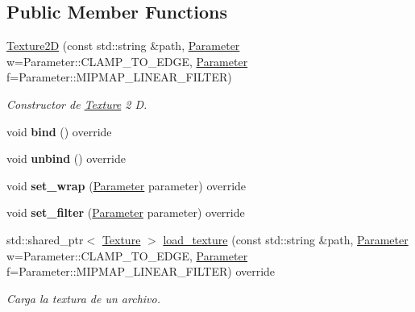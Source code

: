 \subsection*{Public Member Functions}
\begin{DoxyCompactItemize}
\item 
\mbox{\hyperlink{classexample_1_1_texture2_d_ad23ba32ac7e93532c2b794eb71593bfd}{Texture2D}} (const std\+::string \&path, \mbox{\hyperlink{classexample_1_1_texture_a4f7233e69c4a5b913dbe53d729c1765f}{Parameter}} w=Parameter\+::\+C\+L\+A\+M\+P\+\_\+\+T\+O\+\_\+\+E\+D\+GE, \mbox{\hyperlink{classexample_1_1_texture_a4f7233e69c4a5b913dbe53d729c1765f}{Parameter}} f=Parameter\+::\+M\+I\+P\+M\+A\+P\+\_\+\+L\+I\+N\+E\+A\+R\+\_\+\+F\+I\+L\+T\+ER)
\begin{DoxyCompactList}\small\item\em Constructor de \mbox{\hyperlink{classexample_1_1_texture}{Texture}} 2 D. \end{DoxyCompactList}\item 
\mbox{\label{classexample_1_1_texture2_d_a55a3a2e435a2590fb97b732436dbda23}} 
void {\bfseries bind} () override
\item 
\mbox{\label{classexample_1_1_texture2_d_a9a8bd3b33cac53ce5b65a71428e6bd93}} 
void {\bfseries unbind} () override
\item 
\mbox{\label{classexample_1_1_texture2_d_aa11b8b77c8db7c70d686f6e830ce0397}} 
void {\bfseries set\+\_\+wrap} (\mbox{\hyperlink{classexample_1_1_texture_a4f7233e69c4a5b913dbe53d729c1765f}{Parameter}} parameter) override
\item 
\mbox{\label{classexample_1_1_texture2_d_a09bef9925fdac334919759201cdb1b1b}} 
void {\bfseries set\+\_\+filter} (\mbox{\hyperlink{classexample_1_1_texture_a4f7233e69c4a5b913dbe53d729c1765f}{Parameter}} parameter) override
\item 
std\+::shared\+\_\+ptr$<$ \mbox{\hyperlink{classexample_1_1_texture}{Texture}} $>$ \mbox{\hyperlink{classexample_1_1_texture2_d_af31ea7464d42ad7f9b93ce5218ba5849}{load\+\_\+texture}} (const std\+::string \&path, \mbox{\hyperlink{classexample_1_1_texture_a4f7233e69c4a5b913dbe53d729c1765f}{Parameter}} w=Parameter\+::\+C\+L\+A\+M\+P\+\_\+\+T\+O\+\_\+\+E\+D\+GE, \mbox{\hyperlink{classexample_1_1_texture_a4f7233e69c4a5b913dbe53d729c1765f}{Parameter}} f=Parameter\+::\+M\+I\+P\+M\+A\+P\+\_\+\+L\+I\+N\+E\+A\+R\+\_\+\+F\+I\+L\+T\+ER) override
\begin{DoxyCompactList}\small\item\em Carga la textura de un archivo. \end{DoxyCompactList}\end{DoxyCompactItemize}
